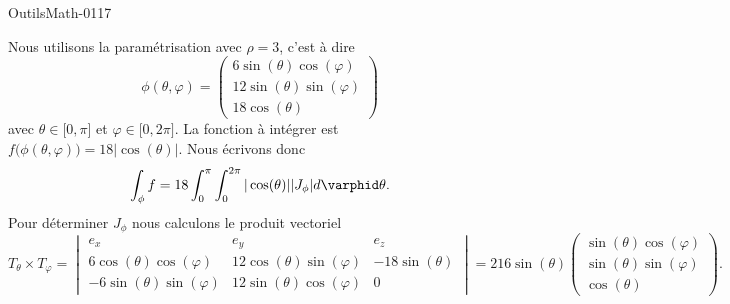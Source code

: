 
\begin{corrige}{OutilsMath-0117}

    Nous utilisons la paramétrisation avec \( \rho=3\), c'est à dire
    \begin{equation}
        \phi(\theta,\varphi)=\begin{pmatrix}
            6\sin(\theta)\cos(\varphi)    \\ 
            12\sin(\theta)\sin(\varphi)    \\ 
            18\cos(\theta)    
        \end{pmatrix}
    \end{equation}
    avec \( \theta\in\mathopen[ 0 , \pi \mathclose]\) et \( \varphi\in\mathopen[ 0 , 2\pi \mathclose]\). La fonction à intégrer est \( f\big( \phi(\theta,\varphi) \big)=18| \cos(\theta) |\). Nous écrivons donc
    \begin{equation}
        \int_{\phi}f=18\int_0^{\pi}\int_0^{2\pi}| \cos(\theta) | |J_{\phi} |d\varphid\theta.
    \end{equation}
    Pour déterminer \( J_{\phi}\) nous calculons le produit vectoriel
    \begin{equation}
        T_{\theta}\times T_{\varphi}=\begin{vmatrix}
            e_x    &   e_y    &   e_z    \\
            6\cos(\theta)\cos(\varphi)    &  12\cos(\theta)\sin(\varphi)     &   -18\sin(\theta)    \\
            -6\sin(\theta)\sin(\varphi)    &   12\sin(\theta)\cos(\varphi)    &   0
        \end{vmatrix}=216\sin(\theta)\begin{pmatrix}
            \sin(\theta)\cos(\varphi)    \\ 
            \sin(\theta)\sin(\varphi)    \\ 
            \cos(\theta)    
        \end{pmatrix}.
    \end{equation}
    

\end{corrige}
